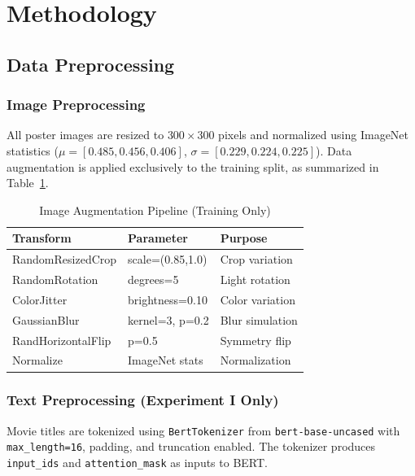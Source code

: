 \documentclass[conference]{IEEEtran}
\begin{document}
\section{Methodology}
\label{sec:method}
\subsection{Data Preprocessing}

\subsubsection{Image Preprocessing}
All poster images are resized to $300 \times 300$ pixels and normalized 
using ImageNet statistics ($\mu = [0.485, 0.456, 0.406]$, 
$\sigma = [0.229, 0.224, 0.225]$). Data augmentation is applied 
exclusively to the training split, as summarized in 
Table~\ref{tab:augmentation}.

\begin{table}[!t]
\caption{Image Augmentation Pipeline (Training Only)}
\label{tab:augmentation}
\begin{center}
\small
\begin{tabular}{lll}
\hline
\textbf{Transform} & \textbf{Parameter} & \textbf{Purpose} \\
\hline
RandomResizedCrop   & scale=(0.85,1.0)   & Crop variation  \\
RandomRotation      & degrees=5          & Light rotation  \\
ColorJitter         & brightness=0.10    & Color variation \\
GaussianBlur        & kernel=3, p=0.2    & Blur simulation \\
RandHorizontalFlip  & p=0.5              & Symmetry flip   \\
Normalize           & ImageNet stats     & Normalization   \\
\hline
\end{tabular}
\end{center}
\end{table}

\subsubsection{Text Preprocessing (Experiment I Only)}
Movie titles are tokenized using \texttt{BertTokenizer} from 
\texttt{bert-base-uncased} with \texttt{max\_length=16}, padding, 
and truncation enabled. The tokenizer produces \texttt{input\_ids} 
and \texttt{attention\_mask} as inputs to BERT.
\end{document}
